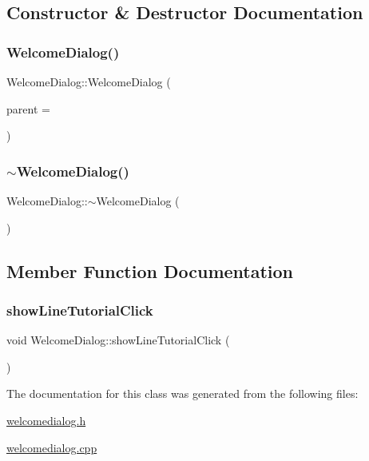 \subsection{Constructor \& Destructor Documentation}
\mbox{\label{class_welcome_dialog_a1841278dd21a0e135b6e14b65857d3bc}} 
\subsubsection{\texorpdfstring{Welcome\+Dialog()}{WelcomeDialog()}}
{\footnotesize\ttfamily Welcome\+Dialog\+::\+Welcome\+Dialog (\begin{DoxyParamCaption}\item[{Q\+Widget $\ast$}]{parent = {} }\end{DoxyParamCaption})\hspace{0.3cm}{\ttfamily [explicit]}}

\mbox{\label{class_welcome_dialog_aff7416acdda782ac3196ae28ea2ebe80}} 
\subsubsection{\texorpdfstring{$\sim$\+Welcome\+Dialog()}{~WelcomeDialog()}}
{\footnotesize\ttfamily Welcome\+Dialog\+::$\sim$\+Welcome\+Dialog (\begin{DoxyParamCaption}{ }\end{DoxyParamCaption})}



\subsection{Member Function Documentation}
\mbox{\label{class_welcome_dialog_a13b5b9dd60876c39de70703d75949710}} 
\subsubsection{\texorpdfstring{show\+Line\+Tutorial\+Click}{showLineTutorialClick}}
{\footnotesize\ttfamily void Welcome\+Dialog\+::show\+Line\+Tutorial\+Click (\begin{DoxyParamCaption}{ }\end{DoxyParamCaption})\hspace{0.3cm}{\ttfamily [signal]}}



The documentation for this class was generated from the following files\+:\begin{DoxyCompactItemize}
\item 
\hyperlink{welcomedialog_8h}{welcomedialog.\+h}\item 
\hyperlink{welcomedialog_8cpp}{welcomedialog.\+cpp}\end{DoxyCompactItemize}
